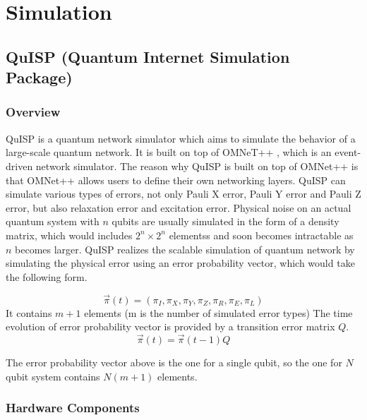 \chapter{Simulation}
\label{simulation}

\section{QuISP (Quantum Internet Simulation Package)}

\subsection{Overview}

QuISP \cite{satoh2022quisp} is a quantum network simulator which aims to simulate the behavior of a large-scale quantum network. It is built on top of OMNeT++ \cite{10.5555/1416222.1416290}, which is an event-driven network simulator.
The reason why QuISP is built on top of OMNet++ is that OMNet++ allows users to define their own networking layers.
QuISP can simulate various types of errors, not only Pauli X error, Pauli Y error and Pauli Z error, but also relaxation error and excitation error.
Physical noise on an actual quantum system with $n$ qubits are usually simulated in the form of a density matrix, which would includes $2^n \times 2^n$ elementss and soon becomes intractable as $n$ becomes larger.
QuISP realizes the scalable simulation of quantum network by simulating the physical error using an error probability vector, which would take the following form.

\begin{equation}
  \overrightarrow{\pi}(t) = (\pi_I, \pi_X, \pi_Y, \pi_Z, \pi_R, \pi_E, \pi_L)
\end{equation}
It contains $m+1$ elements (m is the number of simulated error types)
The time evolution of error probability vector is provided by a transition error matrix $Q$.
\begin{equation}
  \overrightarrow{\pi}(t) = \overrightarrow{\pi}(t-1)Q 
\end{equation}

The error probability vector above is the one for a single qubit, so the one for $N$ qubit system contains $N(m+1)$ elements.

\subsection{Hardware Components}

